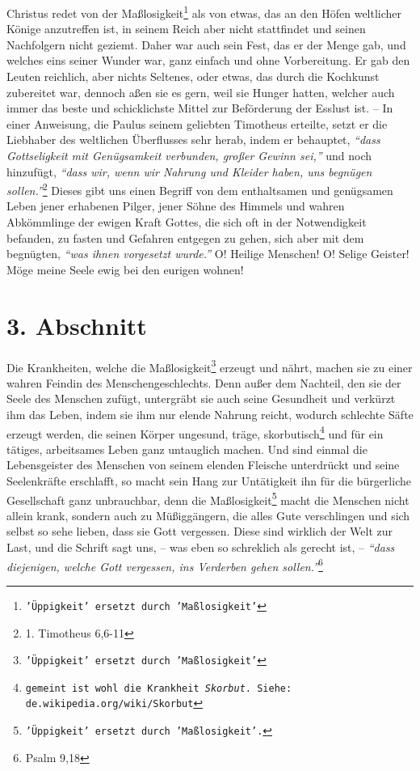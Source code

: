 \medskip

Christus redet von der Maßlosigkeit\footnote{\texttt{'Üppigkeit' ersetzt durch
'Maßlosigkeit'}} als von
etwas, das an den Höfen weltlicher
Könige anzutreffen ist, in seinem Reich aber nicht stattfindet und seinen
Nachfolgern nicht geziemt. Daher war auch sein Fest, das er der Menge gab, und
welches eins seiner Wunder war, ganz einfach und ohne Vorbereitung. Er gab den
Leuten reichlich, aber nichts Seltenes, oder etwas, das durch die
Kochkunst
zubereitet war, dennoch aßen sie es gern, weil sie Hunger hatten, welcher auch
immer das beste und schicklichste Mittel zur Beförderung der Esslust ist. -- In
einer Anweisung, die Paulus seinem geliebten Timotheus erteilte, setzt er die
Liebhaber des weltlichen Überflusses sehr herab, indem er behauptet,
\textit{"`dass Gottseligkeit mit Genügsamkeit verbunden, großer Gewinn sei,"'}
und noch
hinzufügt, \textit{"`dass wir, wenn wir Nahrung und Kleider haben, uns begnügen
sollen."'}\footnote{1. Timotheus 6,6-11}
Dieses gibt uns einen Begriff von dem
enthaltsamen und genügsamen Leben jener erhabenen
Pilger, jener
Söhne des Himmels und wahren Abkömmlinge der
ewigen Kraft
Gottes, die sich oft in der
Notwendigkeit befanden, zu fasten und Gefahren entgegen zu gehen,
sich aber
mit dem begnügten, \textit{"`was ihnen vorgesetzt wurde."'} O! Heilige Menschen!
O!
Selige Geister! Möge meine Seele ewig bei den eurigen wohnen!

\section{3. Abschnitt} \label{kap14_ab3}

Die Krankheiten, welche die Maßlosigkeit\footnote{\texttt{'Üppigkeit' ersetzt
durch 'Maßlosigkeit'}} erzeugt
und nährt, machen sie zu einer
wahren Feindin des Menschengeschlechts. Denn außer dem Nachteil, den sie der
Seele des Menschen zufügt, untergräbt sie auch seine
Gesundheit und verkürzt ihm
das Leben, indem sie ihm nur elende Nahrung reicht, wodurch schlechte Säfte
erzeugt werden, die seinen Körper ungesund, träge,
skorbutisch\footnote{\texttt{gemeint ist
wohl die Krankheit \textit{Skorbut}. Siehe: de.wikipedia.org/wiki/Skorbut}} und
für ein tätiges,
arbeitsames Leben ganz untauglich machen. Und sind
einmal die Lebensgeister des
Menschen von seinem elenden Fleische unterdrückt und seine Seelenkräfte
erschlafft, so macht sein Hang zur Untätigkeit ihn für die
bürgerliche Gesellschaft
 ganz unbrauchbar,
denn die Maßlosigkeit\footnote{\texttt{'Üppigkeit' ersetzt durch 'Maßlosigkeit'.}}
macht die Menschen nicht
allein krank, sondern auch zu Müßiggängern, die alles Gute
verschlingen und
sich selbst so sehe lieben, dass sie Gott vergessen. Diese sind wirklich der
Welt
zur Last, und die Schrift sagt uns, -- was eben so
schreklich
als gerecht ist,
-- \textit{"`dass diejenigen, welche Gott vergessen, ins Verderben gehen
sollen."'}\footnote{Psalm 9,18}

